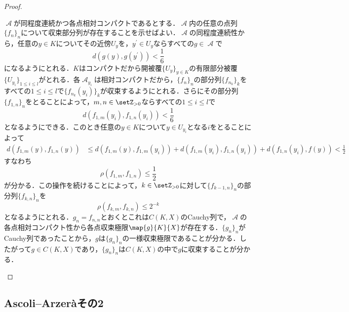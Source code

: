 \documentclass[uplatex]{jsarticle}
\begin{document}
\begin{proof}
\begin{subproof}{}
$\mscrA$が同程度連続かつ各点相対コンパクトであるとする．$\mscrA$内の任意の点列$\{f_n\}_n$について収束部分列が存在することを示せばよい．$\mscrA$の同程度連続性から，任意の$y\in K$についてその近傍$U_y$を，$y^\prime\in U_y$ならすべての$g\in \mscrA$で
\[ d(g(y),g(y^\prime)) < \frac{1}{6} \]
になるようにとれる．$K$はコンパクトだから開被覆$\{U_y\}_{y\in K}$の有限部分被覆$\{U_{y_i}\}_{1\leq i\leq l}$がとれる．各$\mscrA_{y_i}$は相対コンパクトだから，$\{f_n\}_n$の部分列$\{f_{n_k}\}_k$をすべての$1\leq i\leq l$で$\{f_{n_k}(y_i)\}_k$が収束するようにとれる．さらにその部分列$\{f_{1,n}\}_n$をとることによって，$m,n\in \setZ_{>0}$ならすべての$1\leq i\leq l$で
\[ d(f_{1,m}(y_i),f_{1,n}(y_i)) < \frac{1}{6} \]
となるようにできる．このとき任意の$y\in K$について$y\in U_{y_i}$となる$i$をとることによって
\begin{align*}
d(f_{1,m}(y),f_{1,n}(y)) &\leq d(f_{1,m}(y),f_{1,m}(y_i)) + d(f_{1,m}(y_i),f_{1,n}(y_i)) + d(f_{1,n}(y_i),f(y)) < \frac{1}{2}
\end{align*}
すなわち
\[ \rho(f_{1,m},f_{1,n}) \leq \frac{1}{2} \]
が分かる．この操作を続けることによって，$k\in \setZ_{>0}$に対して$\{f_{k-1,n}\}_n$の部分列$\{f_{k,n}\}_n$を
\[ \rho(f_{k,m},f_{k,n})\leq 2^{-k} \]
となるようにとれる．$g_n=f_{n,n}$とおくとこれは$C(K,X)$のCauchy列で，$\mscrA$の各点相対コンパクト性から各点収束極限$\map{g}{K}{X}$が存在する．$\{g_n\}_n$がCauchy列であったことから，$g$は$\{g_n\}_n$の一様収束極限であることが分かる．したがって$g\in C(K,X)$であり，$\{g_n\}_n$は$C(K,X)$の中で$g$に収束することが分かる．
\end{subproof}
\end{proof}

\subsection{Ascoli--Arzer\`{a}その2}
\end{document}
